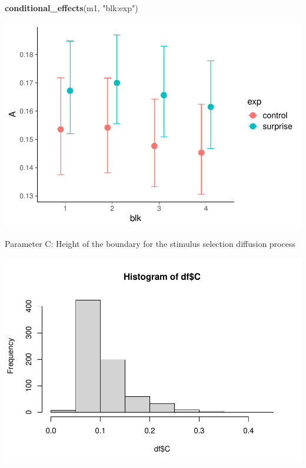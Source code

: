 \documentclass[
]{article}
\newenvironment{Shaded}{\begin{snugshade}}{\end{snugshade}}
\newcommand{\FunctionTok}[1]{\textcolor[rgb]{0.13,0.29,0.53}{\textbf{#1}}}
\newcommand{\NormalTok}[1]{#1}
\newcommand{\SpecialCharTok}[1]{\textcolor[rgb]{0.81,0.36,0.00}{\textbf{#1}}}
\newcommand{\StringTok}[1]{\textcolor[rgb]{0.31,0.60,0.02}{#1}}
\begin{document}
\begin{Shaded}
\begin{Highlighting}[]
\FunctionTok{conditional\_effects}\NormalTok{(m1, }\StringTok{"blk:exp"}\NormalTok{)}
\end{Highlighting}
\end{Shaded}

\includegraphics{params_analyses_files/figure-latex/unnamed-chunk-2-2.pdf}

Parameter C: Height of the boundary for the stimulus selection diffusion
process

\begin{Shaded}
\end{Shaded}

\includegraphics{params_analyses_files/figure-latex/unnamed-chunk-3-1.pdf}
\end{document}
